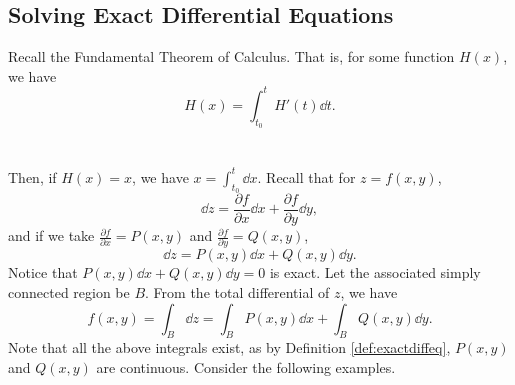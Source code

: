     \subsection{Solving Exact Differential Equations}

        Recall the Fundamental Theorem of Calculus. That is, for some function \(H(x)\), we have
        \begin{equation*}
            H(x)=\int_{t_0}^t H'(t)\dd t.
        \end{equation*}
        \vphantom
        \\
        \\
        Then, if \(H(x)=x\), we have \(x=\int_{t_0}^t \dd x\). Recall that for \(z=f(x,y)\), 
        \begin{equation*}
            \dd z = \frac{\partial f}{\partial x}\dd x+\frac{\partial f}{\partial y} \dd y,
        \end{equation*}
        and if we take \(\frac{\partial f}{\partial x}=P(x,y)\) and \(\frac{\partial f}{\partial y}=Q(x,y)\),
        \begin{equation*}
            \dd z=P(x,y)\dd x+Q(x,y)\dd y.
        \end{equation*}
        Notice that \(P(x,y)\dd x+Q(x,y)\dd y=0\) is exact. Let the associated simply connected region be \(B\). From the total differential of \(z\), we have
        \begin{equation*}
            f(x,y)=\int_B \dd z=\int_B P(x,y)\dd x+\int_B Q(x,y)\dd y.
        \end{equation*}
        Note that all the above integrals exist, as by Definition \ref{def:exactdiffeq}, \(P(x,y)\) and \(Q(x,y)\) are continuous. Consider the following examples.
